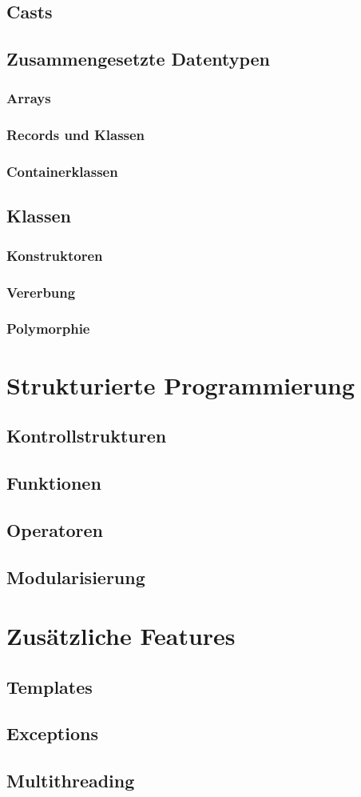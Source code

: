 \documentclass[a4paper]{report}
\begin{document}
\section{Casts}
\section{Zusammengesetzte Datentypen}
\subsection{Arrays}
\subsection{Records und Klassen}
\subsection{Containerklassen}
\section{Klassen}
\subsection{Konstruktoren}
\subsection{Vererbung}
\subsection{Polymorphie}

\chapter{Strukturierte Programmierung}
\section{Kontrollstrukturen}
\section{Funktionen}
\section{Operatoren}
\section{Modularisierung}

\chapter{Zusätzliche Features}
\section{Templates}
\section{Exceptions}
\section{Multithreading}
\end{document}

